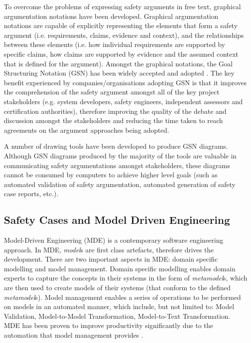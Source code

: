 To overcome the problems of expressing safety arguments in free text, graphical argumentation notations have been developed. Graphical argumentation notations are capable of explicitly representing the elements that form a safety argument (i.e. requirements, claims, evidence and context), and the relationships between these elements (i.e. how individual requirements are supported by specific claims, how claims are supported by evidence and the assumed context that is defined for the argument). 
Amongst the graphical notations, the Goal Structuring Notation (GSN) \cite{kelly2004goal} has been widely accepted and adopted \cite{chinneck2004turning}. 
The key benefit experienced by companies/organisations adopting GSN is that it improves the comprehension of the safety argument amongst all of the key project stakeholders (e.g. system developers, safety engineers, independent assessors and certification authorities), therefore improving the quality of the debate and discussion amongst the stakeholders and reducing the time taken to reach agreements on the argument approaches being adopted.

A number of drawing tools have been developed \cite{asce, iscade, yorkgsn} to produce GSN diagrams. Although GSN diagrams produced by the majority of the tools are valuable in communicating safety argumentations amongst stakeholders, these diagrams cannot be consumed by computers to achieve higher level goals (such as automated validation of safety argumentation, automated generation of safety case reports, etc.). 


\subsection{Safety Cases and Model Driven Engineering}
Model-Driven Engineering (MDE) is a contemporary software engineering approach. In MDE, \textit{model}s are first class artefacts, therefore drives the development. There are two important aspects in MDE: domain specific modelling and model management. Domain specific modelling enables domain experts to capture the concepts in their systems in the form of \textit{metamodel}s, which are then used to create models of their systems (that conform to the defined \textit{metamodel}s). Model management enables a series of operations to be performed on models in an automated manner, which include, but not limited to: Model Validation, Model-to-Model Transformation, Model-to-Text Transformation. MDE has been proven to improve productivity significantly due to the automation that model management provides \cite{}. 


